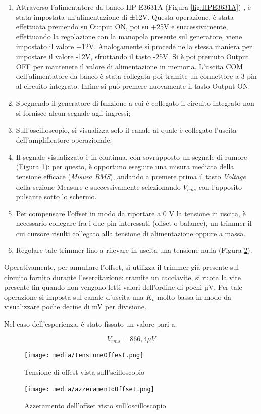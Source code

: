 \begin{enumerate}
    \item Attraverso l'alimentatore da banco HP E3631A (Figura \ref{fig:HPE3631A}) , è stata impostata un'alimentazione di ±12V. Questa operazione, è stata effettuata premendo su Output ON, poi  su +25V e successivamente, effettuando la regolazione con la manopola presente sul generatore, viene impostato il valore +12V. Analogamente si procede nella stessa maniera per impostare il valore -12V, sfruttando il tasto -25V.  Si è poi premuto Output OFF per mantenere il valore di alimentazione in memoria. L'uscita COM dell'alimentatore da banco è stata collegata poi tramite un connettore a 3 pin al circuito integrato. Infine si può premere nuovamente il tasto Output ON. 
    \item Spegnendo il generatore di funzione a cui è collegato il circuito integrato non si fornisce alcun segnale agli ingressi;
    \item  Sull’oscilloscopio, si visualizza solo il canale al quale è collegato l’uscita dell’amplificatore operazionale.
    \item  Il segnale visualizzato è in continua, con sovrapposto un segnale di rumore (Figura \ref{fig:tensioneOffset}): per questo, è opportuno eseguire una misura mediata della tensione efficace (\textit{Misura RMS}), andando a premere prima il tasto \textit{Voltage} della sezione Measure e successivamente selezionando $V_{rms}$ con l'apposito pulsante sotto lo schermo.
    \item  Per compensare l’offset in modo da riportare a 0 V la tensione in uscita, è necessario collegare fra i due pin interessati (offset o balance), un trimmer il cui cursore risulti collegato alla tensione di alimentazione oppure a massa.
    \item Regolare tale trimmer fino a rilevare in uscita una tensione nulla (Figura \ref{fig:azzeramentoOffset}). 
\end{enumerate}

Operativamente, per annullare l’offset, si utilizza il trimmer già presente sul circuito fornito durante l’esercitazione: tramite un cacciavite, si ruota la vite presente fin quando non vengono letti valori dell’ordine di pochi µV.  Per tale operazione si imposta  sul canale d'uscita una  $K_v$ molto bassa in modo da visualizzare  poche decine di mV per divisione.
  
Nel caso dell'esperienza, è stato fissato un valore pari a:

\[V_{rms}=866,4 \mu V\]
\FloatBarrier
\begin{figure}
    \centering
    \texttt{[image: media/tensioneOffest.png]}
    \caption{Tensione di offest vista sull'scilloscopio}
    \label{fig:tensioneOffset}
\end{figure}
\begin{figure}
    \centering
    \texttt{[image: media/azzeramentoOffset.png]}
    \caption{Azzeramento dell'offset visto sull'oscilloscopio}
    \label{fig:azzeramentoOffset}
\end{figure}
\FloatBarrier

